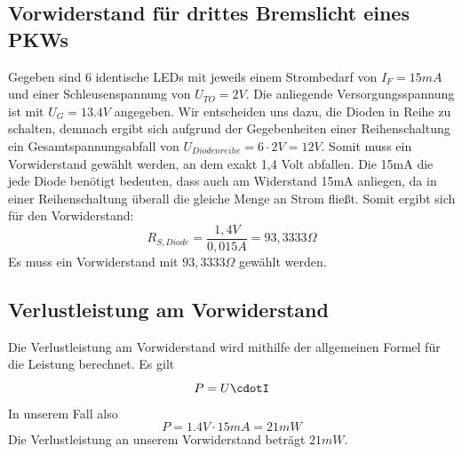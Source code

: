 \documentclass[
a4paper,     %
 headsepline, %
11pt         %
]{scrartcl}  %
\begin{document}
\subsection{Vorwiderstand für drittes Bremslicht eines PKWs}

Gegeben sind 6 identische LEDs mit jeweils einem Strombedarf von $I_F = 15mA$ und einer Schleusenspannung von $U_{TO} = 2V$.
Die anliegende Versorgungsspannung ist mit $U_G = 13.4V$ angegeben.
Wir entscheiden uns dazu, die Dioden in Reihe zu schalten, demnach ergibt sich aufgrund der Gegebenheiten einer Reihenschaltung ein Gesamtspannungsabfall von $U_{Diodenreihe} = 6 \cdot 2V = 12V$. Somit muss ein Vorwiderstand gewählt werden, an dem exakt 1,4 Volt abfallen. Die 15mA die jede Diode benötigt bedeuten, dass auch am Widerstand 15mA anliegen, da in einer Reihenschaltung überall die gleiche Menge an Strom fließt. Somit ergibt sich für den Vorwiderstand:
\[R_{S,Diode}=\frac{1,4V}{0,015A}=93,3333\Omega\]
Es muss ein Vorwiderstand mit $93,3333\Omega$ gewählt werden.

\subsection{Verlustleistung am Vorwiderstand}

Die Verlustleistung am Vorwiderstand wird mithilfe der allgemeinen Formel für die Leistung berechnet.
Es gilt \[P = U\cdotI\]
In unserem Fall also \[P = 1.4V \cdot 15 mA = 21 mW\]
Die Verlustleistung an unserem Vorwiderstand beträgt $21 mW$.



% 

% 
\end{document}
